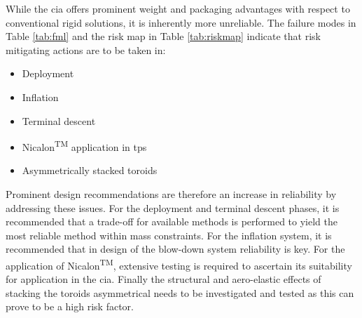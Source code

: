While the \gls{cia} offers prominent weight and packaging advantages with respect to conventional rigid solutions, it is inherently more unreliable. The failure modes in Table \ref{tab:fml} and the risk map in Table \ref{tab:riskmap} indicate that risk mitigating actions are to be taken in:
\begin{itemize}
\item Deployment
\item Inflation
\item Terminal descent
\item Nicalon\textsuperscript{TM} application in \gls{tps}
\item Asymmetrically stacked toroids
\end{itemize}
Prominent design recommendations are therefore an increase in reliability by addressing these issues. For the deployment and terminal descent phases, it is recommended that a trade-off for available methods is performed to yield the most reliable method within mass constraints. For the inflation system, it is recommended that in design of the blow-down system reliability is key. For the application of Nicalon\textsuperscript{TM}, extensive testing is required to ascertain its suitability for application in the \gls{cia}. Finally the structural and aero-elastic effects of stacking the toroids asymmetrical needs to be investigated and tested as this can prove to be a high risk factor.